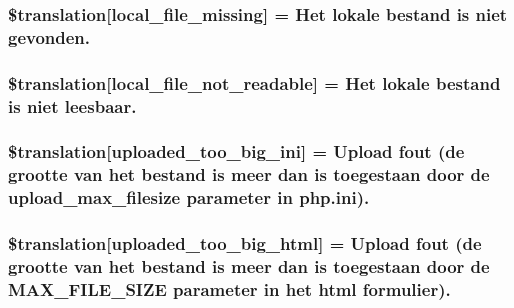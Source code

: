 \subsubsection[{\$translation}]{\setlength{\rightskip}{0pt plus 5cm}\$translation\mbox{[}\textquotesingle{}local\+\_\+file\+\_\+missing\textquotesingle{}\mbox{]} = \textquotesingle{}Het lokale bestand is niet gevonden.\textquotesingle{}}\label{class_8upload_8nl___n_l_8php_a6ec3d3a47ab70d77e7aa593e82ead10e}
\hypertarget{class_8upload_8nl___n_l_8php_a60104befef9b241f3a7a6a755618a4b3}{}
\subsubsection[{\$translation}]{\setlength{\rightskip}{0pt plus 5cm}\$translation\mbox{[}\textquotesingle{}local\+\_\+file\+\_\+not\+\_\+readable\textquotesingle{}\mbox{]} = \textquotesingle{}Het lokale bestand is niet leesbaar.\textquotesingle{}}\label{class_8upload_8nl___n_l_8php_a60104befef9b241f3a7a6a755618a4b3}
\hypertarget{class_8upload_8nl___n_l_8php_a6a08dcd0d3651fdd098568f6b2f0a42c}{}
\subsubsection[{\$translation}]{\setlength{\rightskip}{0pt plus 5cm}\$translation\mbox{[}\textquotesingle{}uploaded\+\_\+too\+\_\+big\+\_\+ini\textquotesingle{}\mbox{]} = \textquotesingle{}Upload fout (de grootte van het bestand is meer dan is toegestaan door de upload\+\_\+max\+\_\+filesize parameter in php.\+ini).\textquotesingle{}}\label{class_8upload_8nl___n_l_8php_a6a08dcd0d3651fdd098568f6b2f0a42c}
\hypertarget{class_8upload_8nl___n_l_8php_a623d5b8b92169f57d7e43458aa911cbb}{}
\subsubsection[{\$translation}]{\setlength{\rightskip}{0pt plus 5cm}\$translation\mbox{[}\textquotesingle{}uploaded\+\_\+too\+\_\+big\+\_\+html\textquotesingle{}\mbox{]} = \textquotesingle{}Upload fout (de grootte van het bestand is meer dan is toegestaan door de M\+A\+X\+\_\+\+F\+I\+L\+E\+\_\+\+S\+I\+Z\+E parameter in het html formulier).\textquotesingle{}}\label{class_8upload_8nl___n_l_8php_a623d5b8b92169f57d7e43458aa911cbb}
\hypertarget{class_8upload_8nl___n_l_8php_a967c17da21b0a2d3bd65cca3a9ca0ea8}{}
